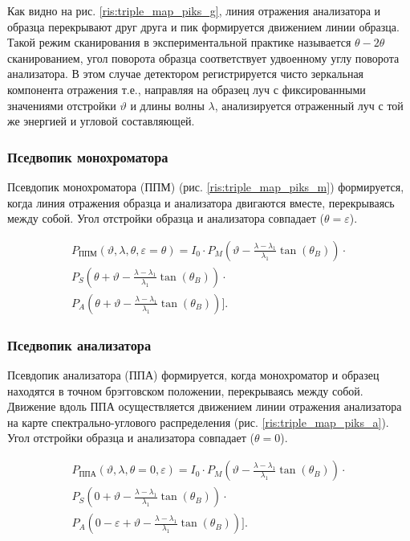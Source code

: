 Как видно на рис. \ref{ris:triple_map_piks_g}, линия отражения анализатора и образца перекрывают друг друга и пик формируется
движением линии образца. Такой режим сканирования в экспериментальной практике называется $\theta-2\theta$ сканированием,
угол поворота образца соответствует удвоенному углу поворота анализатора. В этом случае детектором регистрируется чисто
зеркальная компонента отражения т.е., направляя на образец луч с фиксированными значениями отстройки $\vartheta$ и длины волны
 $\lambda$, анализируется отраженный луч с той же энергией и угловой составляющей.

\subsubsection*{Пседвопик монохроматора}
Псевдопик монохроматора (ППМ) (рис. \ref{ris:triple_map_piks_m}) формируется, когда линия отражения образца и анализатора
двигаются вместе, перекрываясь между собой. Угол отстройки образца и анализатора совпадает ($\theta = \varepsilon$).

\begin{eqnarray} \label{eq:triplr_spectra_angle_map_PPM}
  P_{\text{ППМ}}(\vartheta,\lambda,\theta,\varepsilon = \theta) =I_0\cdot
    P_M \left(\vartheta - \frac{\lambda - \lambda_1}{\lambda_1}\tan(\theta_B) \right) \cdot \nonumber \\
   P_S \left(\theta + \vartheta - \frac{\lambda - \lambda_1}{\lambda_1}\tan(\theta_B)\right)  \cdot  \nonumber \\
   P_A \left(\theta  + \vartheta - \frac{\lambda - \lambda_1}{\lambda_1}\tan(\theta_B)\right) \Bigg].
 \end{eqnarray}

 \subsubsection*{Пседвопик анализатора}
 Псевдопик анализатора (ППА) формируется, когда монохроматор и образец
 находятся в точном брэгговском положении, перекрываясь между собой. Движение вдоль ППА осуществляется
 движением линии отражения анализатора на карте спектрально-углового распределения (рис. \ref{ris:triple_map_piks_a}).
   Угол отстройки образца и анализатора совпадает ($\theta = 0$).

 \begin{eqnarray} \label{eq:triplr_spectra_angle_map_PPM}
   P_{\text{ППА}}(\vartheta,\lambda,\theta=0,\varepsilon) =I_0\cdot
     P_M \left(\vartheta - \frac{\lambda - \lambda_1}{\lambda_1}\tan(\theta_B) \right) \cdot \nonumber \\
    P_S \left(0 + \vartheta - \frac{\lambda - \lambda_1}{\lambda_1}\tan(\theta_B)\right)  \cdot  \nonumber \\
    P_A \left(0-\varepsilon  + \vartheta - \frac{\lambda - \lambda_1}{\lambda_1}\tan(\theta_B)\right) \Bigg].
  \end{eqnarray}


